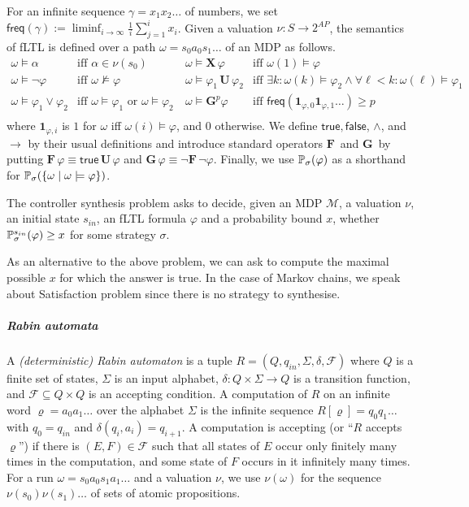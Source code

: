 \documentclass[a4paper,UKenglish]{lipics}
\newcommand{\true}{\mathsf{true}}
\newcommand{\false}{\mathsf{false}}
\newcommand{\mdp}{\mathcal{M}}
\newcommand{\Gf}[1]{\mathbf{G}^{#1}}
\newcommand{\X}{\mathbf{X}\,}
\newcommand{\G}{\mathbf{G}\,}
\newcommand{\U}{\,\mathbf{U}\,}
\newcommand{\F}{\mathbf{F}\,}
\newcommand{\idf}{\mathbf{1}}
\renewcommand{\Pr}[3][]{\ifblank{#1}{\mathbb{P}_{#2}}{\mathbb{P}^{#1}_{#2}}(#3)}
\newcommand{\rabin}{R}
\newcommand{\rstates}{Q}
\newcommand{\rinit}{q_{in}}
\newcommand{\ract}{\Sigma}
\newcommand{\rtra}{\delta}
\newcommand{\racc}{\mathcal{F}}
\newcommand{\freq}[1]{\mathsf{freq}(#1)}
\newcommand{\sinit}{s_{in}}
\begin{document}
For an infinite sequence
$\gamma=x_1x_2\ldots$ of numbers, we set $\freq{\gamma} := \liminf_{i\to \infty} \frac{1}{i} \sum_{j=1}^i x_i$.
Given a valuation $\nu : S \rightarrow 2^\mathit{AP}$, the semantics of fLTL is defined over a path $\omega = s_0a_0s_1\dots$ of an MDP as follows.
\[
{\begin{array}{llll}
	\omega\models \alpha &\text{iff } \alpha\in \nu(s_0)&
	\ \omega\models \X \varphi &\text{iff } \omega(1) \models\varphi\\
	\omega\models \neg \varphi &\text{iff } \omega \not\models\varphi&
	\ \omega\models \varphi_1\U\varphi_2 &\text{iff } \exists k : \omega(k) \models\varphi_2 \wedge \forall \ell{<}k : \omega(\ell) \models \varphi_1\\
	\omega\models \varphi_1 {\vee} \varphi_2 &\text{iff } \omega {\models}\varphi_1\text{ or }\omega{\models}\varphi_2&
	\ \omega\models \Gf{p}\varphi &\text{iff } \freq{\idf_{\varphi,0}\idf_{\varphi,1}\ldots} \ge p\\
	\end{array}
}
\]
where $\idf_{\varphi,i}$ is $1$ for $\omega$ iff $\omega(i) \models \varphi$, and $0$ otherwise.
We define $\true, \false$, $\wedge$, and $\rightarrow$ by their usual definitions and introduce standard operators
$\F$ and $\G$ by putting $\F\varphi \equiv \true \U \varphi$ and
$\G\varphi \equiv \neg \F \neg \varphi$. 
Finally, we use $\Pr{\sigma}{\varphi}$ as a shorthand for $\Pr{\sigma}{\{\omega \mid \omega\models \varphi\}}$.

\begin{definition}
	The controller synthesis problem asks to decide, given an MDP $\mdp$, a valuation $\nu$, an initial state $\sinit$, an fLTL formula $\varphi$ and
	a probability bound $x$, whether
	$\Pr[\sinit]{\sigma}{\varphi} \ge x$ for some strategy $\sigma$.
\end{definition}

As an alternative to the above problem, we can ask to compute the maximal possible $x$ for which the answer is true.
In the case of Markov chains, we speak about {\sf Satisfaction} problem since there is no strategy to synthesise.


\subparagraph{Rabin automata}
A {\em (deterministic) Rabin automaton} is a tuple $\rabin = (\rstates, \rinit, \ract, \rtra, \racc)$ where $\rstates$
is a finite set of states, $\ract$ is an input alphabet, $\rtra : \rstates \times \ract \rightarrow \rstates$
is a transition function, and $\racc \subseteq \rstates \times \rstates$ is an accepting condition.
A computation of $\rabin$ on an infinite word $\varrho = a_0a_1\ldots$ over the alphabet $\ract$ is the
infinite sequence $\rabin[\varrho] = q_0q_1\ldots$ with $q_0=\rinit$ and $\rtra(q_i,a_i) = q_{i+1}$. A computation
is accepting (or ``$R$ accepts $\varrho$'')
if there is $(E,F) \in \racc$ such that all states of $E$ occur only
finitely many times in the computation, and some state of $F$ occurs in it infinitely many times.
For a run $\omega=s_0a_0s_1a_1\ldots$ and a valuation $\nu$, we use $\nu(\omega)$ for the sequence $\nu(s_0)\nu(s_1)\ldots$
of sets of atomic propositions.
\end{document}
